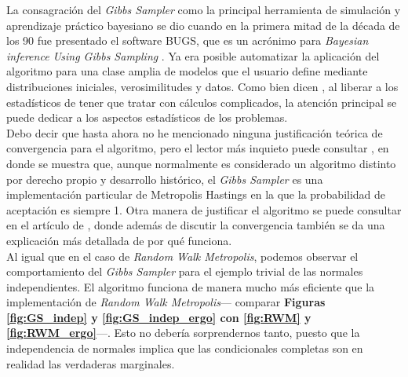 La consagración del \textit{Gibbs Sampler} como la principal herramienta de simulación y aprendizaje práctico bayesiano se dio cuando en la primera mitad de la década de los 90 fue presentado el 	software BUGS, que es un acrónimo para \textit{Bayesian inference Using Gibbs Sampling} \parencite{Betancourt18}. Ya era posible automatizar la aplicación del algoritmo para una clase amplia de modelos que el usuario define mediante distribuciones iniciales, verosimilitudes y datos. Como bien dicen \textcite{CasellaGeorge92}, al liberar a los estadísticos de tener que tratar con cálculos complicados, la atención principal se puede dedicar a los aspectos estadísticos de los problemas.\\ 

Debo decir que hasta ahora no he mencionado ninguna justificación teórica de convergencia para el algoritmo, pero el lector más inquieto puede consultar \textcite{Geyer05}, en donde se muestra que, aunque normalmente es considerado un algoritmo distinto por derecho propio y desarrollo histórico, el \textit{Gibbs Sampler} es una implementación particular de Metropolis Hastings en la que la probabilidad de aceptación es siempre 1. Otra manera de justificar el algoritmo se puede consultar en el artículo de \textcite{CasellaGeorge92}, donde además de discutir la convergencia también se da una explicación más detallada de por qué funciona.\\  

Al igual que en el caso de \textit{Random Walk Metropolis}, podemos observar el comportamiento del \textit{Gibbs Sampler} para el ejemplo trivial de las normales independientes. El algoritmo funciona de manera mucho más eficiente que la implementación de \textit{Random Walk Metropolis}--- comparar \textbf{Figuras \ref{fig:GS_indep} y \ref{fig:GS_indep_ergo} con \ref{fig:RWM} y \ref{fig:RWM_ergo}}---. Esto no debería sorprendernos tanto, puesto que la independencia de normales implica que las condicionales completas son en realidad las verdaderas marginales.\\ 

